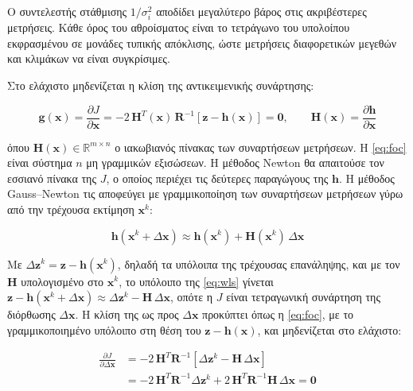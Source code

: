 Ο συντελεστής στάθμισης $1/\sigma_i^2$ αποδίδει μεγαλύτερο βάρος στις ακριβέστερες μετρήσεις.
Κάθε όρος του αθροίσματος είναι το τετράγωνο του υπολοίπου εκφρασμένου σε μονάδες τυπικής
απόκλισης, ώστε μετρήσεις διαφορετικών μεγεθών και κλιμάκων να είναι συγκρίσιμες.

Στο ελάχιστο μηδενίζεται η κλίση της αντικειμενικής συνάρτησης:

\begin{equation}
\mathbf{g}(\mathbf{x}) = \frac{\partial J}{\partial \mathbf{x}}
  = -2\,\mathbf{H}^{T}(\mathbf{x})\,\mathbf{R}^{-1}\left[\mathbf{z} - \mathbf{h}(\mathbf{x})\right]
  = \mathbf{0}, \qquad
\mathbf{H}(\mathbf{x}) = \frac{\partial \mathbf{h}}{\partial \mathbf{x}}
\label{eq:foc}
\end{equation}

όπου $\mathbf{H}(\mathbf{x}) \in \mathbb{R}^{m \times n}$ ο ιακωβιανός πίνακας των συναρτήσεων
μετρήσεων. Η \eqref{eq:foc} είναι σύστημα $n$ μη γραμμικών εξισώσεων. Η μέθοδος Newton θα
απαιτούσε τον εσσιανό πίνακα της $J$, ο οποίος περιέχει τις δεύτερες παραγώγους της
$\mathbf{h}$. Η μέθοδος Gauss--Newton τις αποφεύγει με γραμμικοποίηση των συναρτήσεων
μετρήσεων γύρω από την τρέχουσα εκτίμηση $\mathbf{x}^{k}$:

\begin{equation}
\mathbf{h}(\mathbf{x}^{k} + \Delta\mathbf{x}) \approx \mathbf{h}(\mathbf{x}^{k}) +
\mathbf{H}(\mathbf{x}^{k})\,\Delta\mathbf{x}
\label{eq:gn-lin}
\end{equation}

Με $\Delta\mathbf{z}^{k} = \mathbf{z} - \mathbf{h}(\mathbf{x}^{k})$, δηλαδή τα υπόλοιπα της
τρέχουσας επανάληψης, και με τον $\mathbf{H}$ υπολογισμένο στο $\mathbf{x}^{k}$, το υπόλοιπο
της \eqref{eq:wls} γίνεται $\mathbf{z} - \mathbf{h}(\mathbf{x}^{k} + \Delta\mathbf{x}) \approx
\Delta\mathbf{z}^{k} - \mathbf{H}\,\Delta\mathbf{x}$, οπότε η $J$ είναι τετραγωνική συνάρτηση της
διόρθωσης $\Delta\mathbf{x}$. Η κλίση της ως προς $\Delta\mathbf{x}$ προκύπτει όπως η
\eqref{eq:foc}, με το γραμμικοποιημένο υπόλοιπο στη θέση του
$\mathbf{z} - \mathbf{h}(\mathbf{x})$, και μηδενίζεται στο ελάχιστο:

\begin{equation}
\begin{aligned}
\frac{\partial J}{\partial \Delta\mathbf{x}}
  &= -2\,\mathbf{H}^{T}\mathbf{R}^{-1}\left[\Delta\mathbf{z}^{k} - \mathbf{H}\,\Delta\mathbf{x}\right] \\
  &= -2\,\mathbf{H}^{T}\mathbf{R}^{-1}\Delta\mathbf{z}^{k}
     + 2\,\mathbf{H}^{T}\mathbf{R}^{-1}\mathbf{H}\,\Delta\mathbf{x} = \mathbf{0}
\end{aligned}
\label{eq:gn-grad}
\end{equation}

